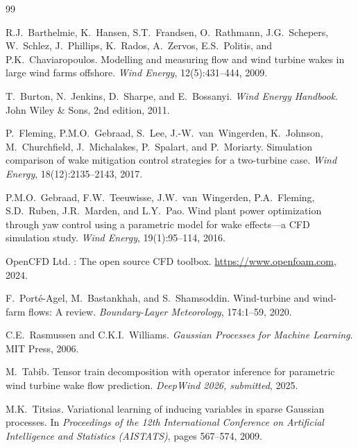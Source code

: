 \documentclass[12pt]{article}
\begin{document}
\begin{thebibliography}{99}

R.J.~Barthelmie, K.~Hansen, S.T.~Frandsen, O.~Rathmann, J.G.~Schepers, W.~Schlez, J.~Phillips, K.~Rados, A.~Zervos, E.S.~Politis, and P.K.~Chaviaropoulos.
\newblock Modelling and measuring flow and wind turbine wakes in large wind farms offshore.
\newblock \emph{Wind Energy}, 12(5):431--444, 2009.

T.~Burton, N.~Jenkins, D.~Sharpe, and E.~Bossanyi.
\newblock \emph{Wind Energy Handbook}.
\newblock John Wiley \& Sons, 2nd edition, 2011.

P.~Fleming, P.M.O.~Gebraad, S.~Lee, J.-W.~van~Wingerden, K.~Johnson, M.~Churchfield, J.~Michalakes, P.~Spalart, and P.~Moriarty.
\newblock Simulation comparison of wake mitigation control strategies for a two-turbine case.
\newblock \emph{Wind Energy}, 18(12):2135--2143, 2017.

P.M.O.~Gebraad, F.W.~Teeuwisse, J.W.~van~Wingerden, P.A.~Fleming, S.D.~Ruben, J.R.~Marden, and L.Y.~Pao.
\newblock Wind plant power optimization through yaw control using a parametric model for wake effects---a {CFD} simulation study.
\newblock \emph{Wind Energy}, 19(1):95--114, 2016.

{OpenCFD Ltd.}
: The open source {CFD} toolbox.
\newblock \url{https://www.openfoam.com}, 2024.

F.~Port{\'e}-Agel, M.~Bastankhah, and S.~Shamsoddin.
\newblock Wind-turbine and wind-farm flows: A review.
\newblock \emph{Boundary-Layer Meteorology}, 174:1--59, 2020.

C.E.~Rasmussen and C.K.I.~Williams.
\newblock \emph{Gaussian Processes for Machine Learning}.
\newblock MIT Press, 2006.

M.~Tabib.
\newblock Tensor train decomposition with operator inference for parametric wind turbine wake flow prediction.
\newblock \emph{DeepWind 2026, submitted}, 2025.

M.K.~Titsias.
\newblock Variational learning of inducing variables in sparse {G}aussian processes.
\newblock In \emph{Proceedings of the 12th International Conference on Artificial Intelligence and Statistics (AISTATS)}, pages 567--574, 2009.

\end{thebibliography}
\end{document}
